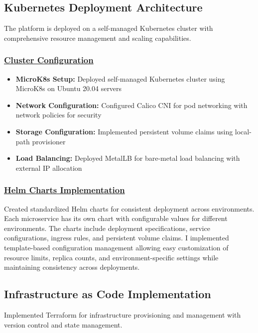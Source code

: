 \subsection{Kubernetes Deployment Architecture}
The platform is deployed on a self-managed Kubernetes cluster with comprehensive resource management and scaling capabilities.

\subsubsection*{\underline{Cluster Configuration}}
\begin{itemize}
    \item \textbf{MicroK8s Setup:} Deployed self-managed Kubernetes cluster using MicroK8s on Ubuntu 20.04 servers
    \item \textbf{Network Configuration:} Configured Calico CNI for pod networking with network policies for security
    \item \textbf{Storage Configuration:} Implemented persistent volume claims using local-path provisioner
    \item \textbf{Load Balancing:} Deployed MetalLB for bare-metal load balancing with external IP allocation
\end{itemize}

\subsubsection*{\underline{Helm Charts Implementation}}
Created standardized Helm charts for consistent deployment across environments. Each microservice has its own chart with configurable values for different environments. The charts include deployment specifications, service configurations, ingress rules, and persistent volume claims. I implemented template-based configuration management allowing easy customization of resource limits, replica counts, and environment-specific settings while maintaining consistency across deployments.

\subsection{Infrastructure as Code Implementation}
Implemented Terraform for infrastructure provisioning and management with version control and state management.

